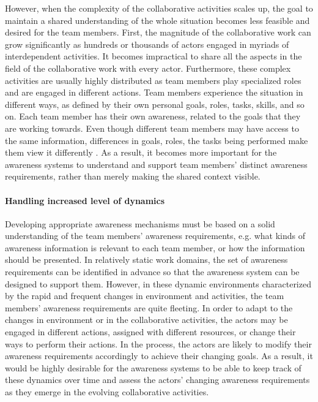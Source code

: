 However, when the complexity of the collaborative activities scales up, the goal to maintain a shared understanding of the whole situation becomes less feasible and desired for the team members. First, the magnitude of the collaborative work can grow significantly as hundreds or thousands of actors engaged in myriads of interdependent activities. It becomes impractical to share all the aspects in the field of the collaborative work with every actor. Furthermore, these complex activities are usually highly distributed as team members play specialized roles and are engaged in different actions. Team members experience the situation in different ways, as defined by their own personal goals, roles, tasks, skills, and so on. Each team member has their own awareness, related to the goals that they are working towards. Even though different team members may have access to the same information, differences in goals, roles, the tasks being performed make them view it differently \cite{Salmon2010}. As a result, it becomes more important for the awareness systems to understand and support team members' distinct awareness requirements, rather than merely making the shared context visible.

\paragraph*{Handling increased level of dynamics} %
\label{par:handling_increased_level_of_dynamics}
Developing appropriate awareness mechanisms must be based on a solid understanding of the team members' awareness requirements, e.g. what kinds of awareness information is relevant to each team member, or how the information should be presented. In relatively static work domains, the set of awareness requirements can be identified in advance so that the awareness system can be designed to support them. However, in these dynamic environments characterized by the rapid and frequent changes in environment and activities, the team members' awareness requirements are quite fleeting. In order to adapt to the changes in environment or in the collaborative activities, the actors may be engaged in different actions, assigned with different resources, or change their ways to perform their actions. In the process, the actors are likely to modify their awareness requirements accordingly to achieve their changing goals. As a result, it would be highly desirable for the awareness systems to be able to keep track of these dynamics over time and assess the actors' changing awareness requirements as they emerge in the evolving collaborative activities.

